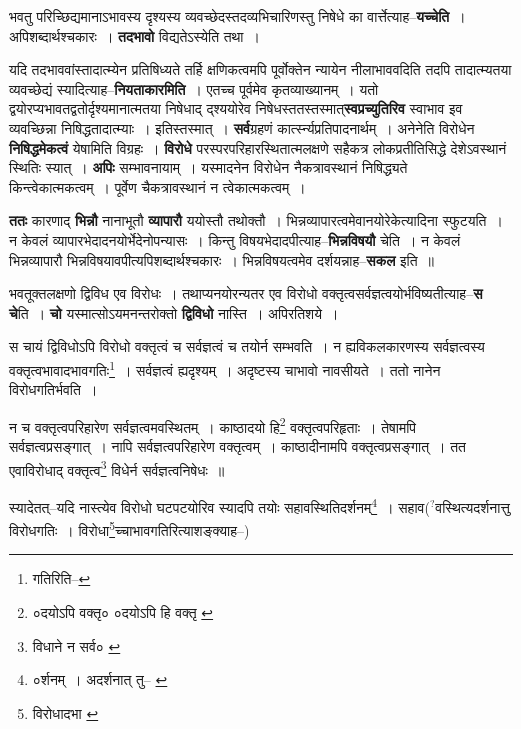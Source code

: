 \documentclass[article,12pt,a4paper]{memoir}
\newcommand{\unclear}[1]{($^{?}$#1)}
\begin{document}
	  \pstart भवतु परिच्छिद्यमानाऽभावस्य दृश्यस्य व्यवच्छेदस्तदव्यभिचारिणस्तु निषेधे का वार्त्तेत्याह--\textbf{यच्चेति} । अपिशब्दार्थश्चकारः । \textbf{तदभावो} विद्यतेऽस्येति तथा ।
	\pend
      

	  \pstart यदि तदभाववांस्तादात्म्येन प्रतिषिध्यते तर्हि क्षणिकत्वमपि पूर्वोक्तेन न्यायेन नीलाभाववदिति तदपि तादात्म्यतया व्यवच्छेद्यं स्यादित्याह--\textbf{नियताकारमिति} । एतच्च पूर्वमेव कृतव्याख्यानम् । यतो द्वयोरप्यभावतद्वतोर्दृश्यमानात्मतया निषेधाद् द्श्ययोरेव निषेधस्ततस्तस्मात्\textbf{स्वप्रच्युतिरिव} स्वाभाव इव व्यवच्छिन्ना निषिद्धतादात्म्याः । इतिस्तस्मात् । \textbf{सर्व}ग्रहणं कार्त्स्न्यप्रतिपादनार्थम् । अनेनेति विरोधेन \textbf{निषिद्धमेकत्वं} येषामिति विग्रहः । \textbf{विरोधे} परस्परपरिहारस्थितात्मलक्षणे सहैकत्र लोकप्रतीतिसिद्धे देशेऽवस्थानं स्थितिः स्यात् । \textbf{अपिः} सम्भावनायाम् । यस्मादनेन विरोधेन नैकत्रावस्थानं निषिद्ध्यते किन्त्वेकात्मकत्वम् । पूर्वेण चैकत्रावस्थानं न त्वेकात्मकत्वम् ।
	\pend
      

	  \pstart \textbf{ततः} कारणाद् \textbf{भिन्नौ} नानाभूतौ \textbf{व्यापारौ} ययोस्तौ तथोक्तौ । भिन्नव्यापारत्वमेवानयोरेकेत्यादिना स्फुटयति । न केवलं व्यापारभेदादनयोर्भेदेनोपन्यासः । किन्तु विषयभेदादपीत्याह--\textbf{भिन्नविषयौ} चेति । न केवलं भिन्नव्यापारौ भिन्नविषयावपीत्यपिशब्दार्थश्चकारः । भिन्नविषयत्वमेव दर्शयन्नाह--\textbf{सकल} इति ॥
	\pend
      

	  \pstart भवतूक्तलक्षणो द्विविध एव विरोधः । तथाप्यनयोरन्यतर एव विरोधो वक्तृत्वसर्वज्ञत्वयोर्भविष्यतीत्याह--\textbf{स चे}ति । \textbf{चो} यस्मात्सोऽयमनन्तरोक्तो \textbf{द्विविधो} नास्ति । अपिरतिशये ।
	\pend
      \leavevmode{}
	  \bigskip
	  \begingroup
	

	  \pstart स चायं द्विविधोऽपि विरोधो वक्तृत्वं च सर्वज्ञत्वं च तयोर्न सम्भवति । न ह्यविकलकारणस्य सर्वज्ञत्वस्य वक्तृत्वभावादभावगतिः\footnote{गतिरिति--\cite{dp-msD}} । सर्वज्ञत्वं ह्यदृश्यम् । अदृष्टस्य चाभावो नावसीयते । ततो नानेन विरोधगतिर्भवति ।
	\pend
       

	  \pstart न च वक्तृत्वपरिहारेण सर्वज्ञत्वमवस्थितम् । काष्ठादयो हि\footnote{०दयोऽपि वक्तृ० \cite{dp-msA} \cite{dp-msB} \cite{dp-edP} \cite{dp-edH} \cite{dp-edE} \cite{dp-edN} ०दयोऽपि हि वक्तृ \cite{dp-msC}} वक्तृत्वपरिहृताः । तेषामपि सर्वज्ञत्वप्रसङ्गात् । नापि सर्वज्ञत्वपरिहारेण वक्तृत्वम् । काष्ठादीनामपि वक्तृत्वप्रसङ्गात् । तत एवाविरोधाद् वक्तृत्व\footnote{विधाने न सर्व० \cite{dp-msA} \cite{dp-msB} \cite{dp-edP} \cite{dp-edH} \cite{dp-edE} \cite{dp-edN}} विधेर्न सर्वज्ञत्वनिषेधः ॥
	\pend
       

	  \pstart स्यादेतत्--यदि नास्त्येव विरोधो घटपटयोरिव स्यादपि तयोः सहावस्थितिदर्शनम्\footnote{०र्शनम् । अदर्शनात् तु--\cite{dp-msA} \cite{dp-msB} \cite{dp-msD} \cite{dp-edP} \cite{dp-edH} \cite{dp-edE} \cite{dp-edN}} । सहाव\unclear{वस्थित्यदर्शनात्तु विरोधगतिः । विरोधा\footnote{विरोधादभा \cite{dp-msB} \cite{dp-msD}}च्चाभावगतिरित्याशङ्क्याह--}
	\pend
      
\end{document}
